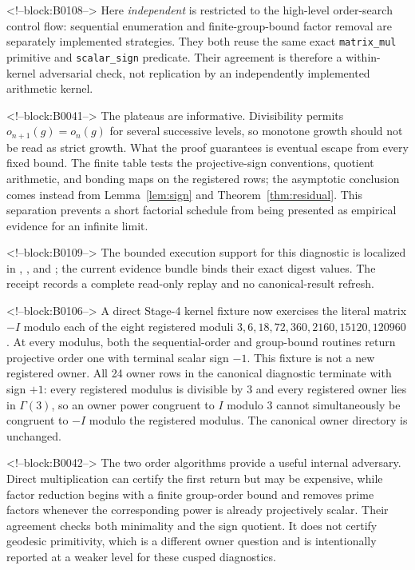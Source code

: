 \documentclass[11pt]{article}
\theoremstyle{definition}
\theoremstyle{remark}
\begin{document}
<!--block:B0108-->
Here \emph{independent} is restricted to the high-level order-search control flow: sequential enumeration and finite-group-bound factor removal are separately implemented strategies. They both reuse the same exact \texttt{matrix\_mul} primitive and \texttt{scalar\_sign} predicate. Their agreement is therefore a within-kernel adversarial check, not replication by an independently implemented arithmetic kernel.

<!--block:B0041-->
The plateaus are informative. Divisibility permits $o_{n+1}(g)=o_n(g)$ for several successive levels, so monotone growth should not be read as strict growth. What the proof guarantees is eventual escape from every fixed bound. The finite table tests the projective-sign conventions, quotient arithmetic, and bonding maps on the registered rows; the asymptotic conclusion comes instead from Lemma~\ref{lem:sign} and Theorem~\ref{thm:residual}. This separation prevents a short factorial schedule from being presented as empirical evidence for an infinite limit.

<!--block:B0109-->
The bounded execution support for this diagnostic is localized in , , and ; the current evidence bundle binds their exact digest values. The receipt records a complete read-only replay and no canonical-result refresh.

<!--block:B0106-->
A direct Stage-4 kernel fixture now exercises the literal matrix $-I$ modulo each of the eight registered moduli $3,6,18,72,360,2160,15120,120960$. At every modulus, both the sequential-order and group-bound routines return projective order one with terminal scalar sign $-1$. This fixture is not a new registered owner. All 24 owner rows in the canonical diagnostic terminate with sign $+1$: every registered modulus is divisible by $3$ and every registered owner lies in $\Gamma(3)$, so an owner power congruent to $I$ modulo $3$ cannot simultaneously be congruent to $-I$ modulo the registered modulus. The canonical owner directory is unchanged.

<!--block:B0042-->
The two order algorithms provide a useful internal adversary. Direct multiplication can certify the first return but may be expensive, while factor reduction begins with a finite group-order bound and removes prime factors whenever the corresponding power is already projectively scalar. Their agreement checks both minimality and the sign quotient. It does not certify geodesic primitivity, which is a different owner question and is intentionally reported at a weaker level for these cusped diagnostics.
\end{document}
